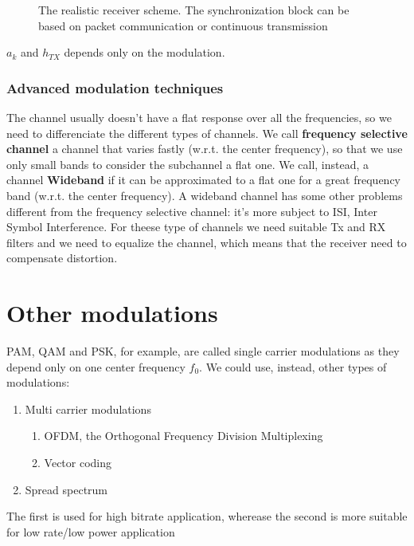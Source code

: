 \begin{figure} \centering
  
  \caption{The realistic receiver scheme. The synchronization block can be based on packet communication or continuous transmission}
  \label{}
\end{figure}

$a_k$ and $h_{TX}$ depends only on the modulation.

\begin{figure} \centering
  
  \caption{}
  \label{}
\end{figure}
\subsubsection{Advanced modulation techniques}
The channel usually doesn't have a flat response over all the frequencies, so we need to differenciate the different types of channels. We call \textbf{ frequency selective channel} a channel that varies fastly (w.r.t. the center frequency), so that we use only small bands to consider the subchannel a flat one. We call, instead, a channel \textbf{Wideband} if it can be approximated
to a flat one for a great frequency band (w.r.t. the center frequency). A wideband channel has some other problems different from the frequency selective channel: it's more subject to ISI, Inter Symbol Interference. For theese type of channels we need suitable Tx and RX filters and we need to equalize the channel, which means that the receiver need to compensate distortion.

\section{Other modulations}
PAM, QAM and PSK, for example, are called single carrier modulations as they depend only on one center frequency $f_0$. We could use, instead, other types of modulations:
\begin{enumerate}
  \item Multi carrier modulations

\begin{enumerate}
  \item OFDM, the Orthogonal Frequency Division Multiplexing
  \item Vector coding
\end{enumerate}
\item Spread spectrum
\end{enumerate}

The first is used for high bitrate application, wherease the second is more suitable for low rate/low power application

